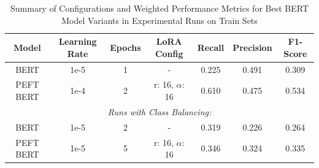 \documentclass[sigconf, natbib=true]{acmart}
\begin{document}
\begin{appendices}
\begin{table}[h]
\caption{Summary of Configurations and Weighted Performance Metrics for Best BERT Model Variants in Experimental Runs on Train Sets}
\label{tab:experimental_runs_train}
\begin{tabular}{c c c c c c c}
\toprule
\textbf{Model} & \textbf{Learning Rate} & \textbf{Epochs} & \textbf{LoRA Config} & \textbf{Recall} & \textbf{Precision} & \textbf{F1-Score} \\ 
\midrule
BERT & 1e-5 & 1 & - & 0.225 & 0.491 & 0.309 \\ 
PEFT BERT & 1e-4 & 2 & r: 16, $\alpha$: 16 & 0.610 & 0.475 & 0.534 \\ 
\midrule
\multicolumn{7}{c}{\textit{Runs with Class Balancing:}} \\
\midrule
BERT & 1e-5 & 2 & - & 0.319 & 0.226 & 0.264 \\ 
PEFT BERT & 1e-5 & 5 & r: 16, $\alpha$: 16 & 0.346 & 0.324 & 0.335 \\
\bottomrule
\end{tabular}
\end{table}

\end{appendices}
\end{document}

